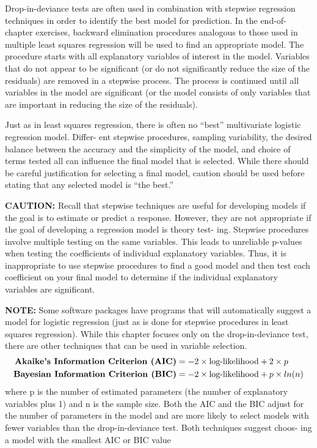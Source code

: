 \documentclass[
]{report}
\begin{document}
Drop-in-deviance tests are often used in combination with stepwise regression techniques in order to
identify the best model for prediction. In the end-of-chapter exercises, backward elimination procedures
analogous to those used in multiple least squares regression will be used to find an appropriate model. The
procedure starts with all explanatory variables of interest in the model. Variables that do not appear to be
significant (or do not significantly reduce the size of the residuals) are removed in a stepwise process. The
process is continued until all variables in the model are significant (or the model consists of only variables
that are important in reducing the size of the residuals).

Just as in least squares regression, there is often no ``best'' multivariate logistic regression model. Differ-
ent stepwise procedures, sampling variability, the desired balance between the accuracy and the simplicity
of the model, and choice of terms tested all can influence the final model that is selected. While there should
be careful justification for selecting a final model, caution should be used before stating that any selected
model is ``the best.''

\large

\textbf{CAUTION:}
Recall that stepwise techniques are useful for developing models if the goal is to estimate or predict a
response. However, they are not appropriate if the goal of developing a regression model is theory test-
ing. Stepwise procedures involve multiple testing on the same variables. This leads to unreliable p-values
when testing the coefficients of individual explanatory variables. Thus, it is inappropriate to use stepwise
procedures to find a good model and then test each coefficient on your final model to determine if the
individual explanatory variables are significant.
\normalsize 

\large

\textbf{NOTE:}
Some software packages have programs that will automatically suggest a model for logistic regression
(just as is done for stepwise procedures in least squares regression). While this chapter focuses only on
the drop-in-deviance test, there are other techniques that can be used in variable selection.
\begin{align}
\textbf{Akaike’s Information Criterion (AIC)} &= -2 \times \text{log-likelihood} + 2 \times p \notag \\
\textbf{Bayesian Information Criterion (BIC)} &= -2 \times \text{log-likelihood} + p \times ln(n) \notag
\end{align}
where p is the number of estimated parameters (the number of explanatory variables plus 1) and n is the
sample size. Both the AIC and the BIC adjust for the number of parameters in the model and are more
likely to select models with fewer variables than the drop-in-deviance test. Both techniques suggest choos-
ing a model with the smallest AIC or BIC value
\normalsize 
\end{document}

